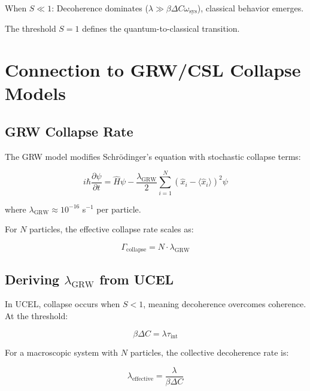 \documentclass[12pt,a4paper]{article}
\begin{document}
When $S \ll 1$: Decoherence dominates ($\lambda \gg \beta \Delta C \omega_{\text{sys}}$), classical behavior emerges.

The threshold $S = 1$ defines the quantum-to-classical transition.

\section{Connection to GRW/CSL Collapse Models}

\subsection{GRW Collapse Rate}

The GRW model modifies Schrödinger's equation with stochastic collapse terms:

\begin{equation}
i\hbar\frac{\partial\psi}{\partial t} = \hat{H}\psi - \frac{\lambda_{\text{GRW}}}{2}\sum_{i=1}^{N}(\hat{x}_i - \langle\hat{x}_i\rangle)^2\psi
\tag{S10}
\end{equation}

where $\lambda_{\text{GRW}} \approx 10^{-16}$ s$^{-1}$ per particle.

For $N$ particles, the effective collapse rate scales as:

\begin{equation}
\Gamma_{\text{collapse}} = N \cdot \lambda_{\text{GRW}}
\tag{S11}
\end{equation}

\subsection{Deriving $\lambda_{\text{GRW}}$ from UCEL}

In UCEL, collapse occurs when $S < 1$, meaning decoherence overcomes coherence. At the threshold:

\begin{equation}
\beta \Delta C = \lambda \tau_{\text{int}}
\tag{S12}
\end{equation}

For a macroscopic system with $N$ particles, the collective decoherence rate is:

\begin{equation}
\lambda_{\text{effective}} = \frac{\lambda}{\beta \Delta C}
\tag{S13}
\end{equation}
\end{document}
